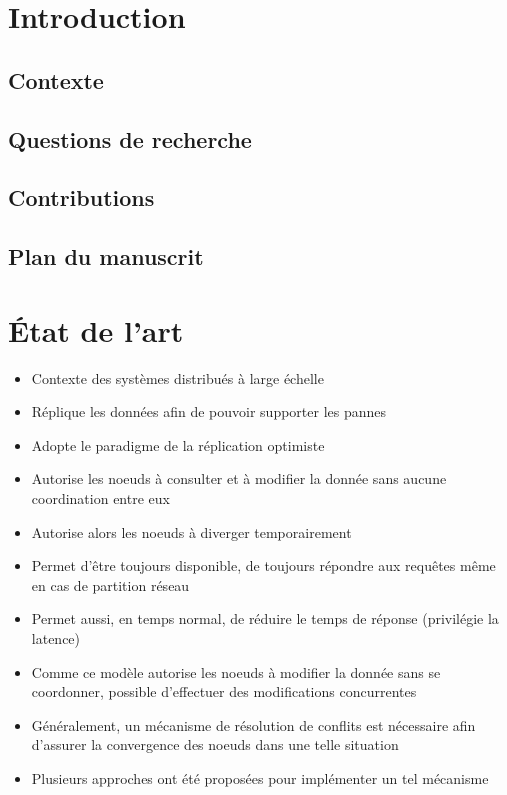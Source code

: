 \documentclass[12pt]{thesul}
\begin{document}
\DontWriteThisInToc
\listoffigures

\mainmatter
\NumberThisInToc
\chapter*{Introduction}
\minitoc
\section{Contexte}
\section{Questions de recherche}
\section{Contributions}
\section{Plan du manuscrit}
% 

% 

\NumberThisInToc
\chapter{État de l'art}
\minitoc

\begin{itemize}
  \item Contexte des systèmes distribués à large échelle
  \item Réplique les données afin de pouvoir supporter les pannes
  \item Adopte le paradigme de la réplication optimiste \cite{10.1145/1057977.1057980}
  \item Autorise les noeuds à consulter et à modifier la donnée sans aucune coordination entre eux
  \item Autorise alors les noeuds à diverger temporairement
  \item Permet d'être toujours disponible, de toujours répondre aux requêtes même en cas de partition réseau
  \item Permet aussi, en temps normal, de réduire le temps de réponse (privilégie la latence) \cite{pacelc2012}
  \item Comme ce modèle autorise les noeuds à modifier la donnée sans se coordonner, possible d'effectuer des modifications concurrentes
  \item Généralement, un mécanisme de résolution de conflits est nécessaire afin d'assurer la convergence des noeuds dans une telle situation
  \item Plusieurs approches ont été proposées pour implémenter un tel mécanisme
\end{itemize}
\end{document}
